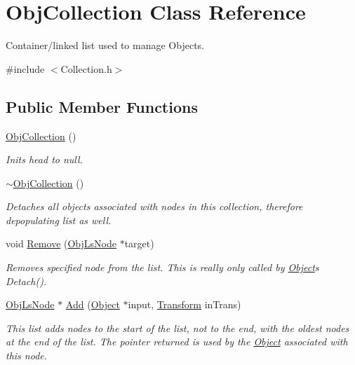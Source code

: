 \hypertarget{class_obj_collection}{}\section{Obj\+Collection Class Reference}
\label{class_obj_collection}


Container/linked list used to manage Objects.  




{\ttfamily \#include $<$Collection.\+h$>$}

\subsection*{Public Member Functions}
\begin{DoxyCompactItemize}
\item 
\hypertarget{class_obj_collection_ac0edc07cad1b67925b032bd93a9e72d8}{}\label{class_obj_collection_ac0edc07cad1b67925b032bd93a9e72d8} 
\hyperlink{class_obj_collection_ac0edc07cad1b67925b032bd93a9e72d8}{Obj\+Collection} ()
\begin{DoxyCompactList}\small\item\em Inits head to null. \end{DoxyCompactList}\item 
\hypertarget{class_obj_collection_a97764e65b3ced57232008835f938b67a}{}\label{class_obj_collection_a97764e65b3ced57232008835f938b67a} 
\hyperlink{class_obj_collection_a97764e65b3ced57232008835f938b67a}{$\sim$\+Obj\+Collection} ()
\begin{DoxyCompactList}\small\item\em Detaches all objects associated with nodes in this collection, therefore depopulating list as well. \end{DoxyCompactList}\item 
\hypertarget{class_obj_collection_a109344a592e7f2daa0f3b4f5dc9d926d}{}\label{class_obj_collection_a109344a592e7f2daa0f3b4f5dc9d926d} 
void \hyperlink{class_obj_collection_a109344a592e7f2daa0f3b4f5dc9d926d}{Remove} (\hyperlink{struct_obj_ls_node}{Obj\+Ls\+Node} $\ast$target)
\begin{DoxyCompactList}\small\item\em Removes specified node from the list. This is really only called by \hyperlink{class_object}{Object}\textquotesingle{}s Detach(). \end{DoxyCompactList}\item 
\hyperlink{struct_obj_ls_node}{Obj\+Ls\+Node} $\ast$ \hyperlink{class_obj_collection_a0fc6d26772a3f657a41ca9360e65b33f}{Add} (\hyperlink{class_object}{Object} $\ast$input, \hyperlink{class_transform}{Transform} in\+Trans)
\begin{DoxyCompactList}\small\item\em This list adds nodes to the start of the list, not to the end, with the oldest nodes at the end of the list. The pointer returned is used by the \hyperlink{class_object}{Object} associated with this node. \end{DoxyCompactList}\end{DoxyCompactItemize}
